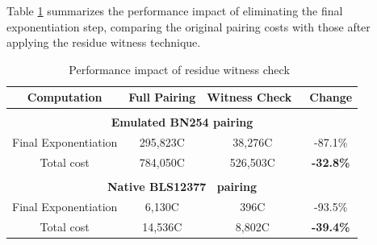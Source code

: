 Table \ref{tab:pairing_performance} summarizes the performance impact of eliminating the final exponentiation step, comparing the original pairing costs with those after applying the residue witness technique.

\begin{table}[h]
\centering
\caption{Performance impact of residue witness check~\cite{EPRINT:NovEag24}}
\label{tab:pairing_performance}
\begin{tabular}{|c|c|c|c|}
\hline
\textbf{Computation} & \textbf{Full Pairing} & \textbf{Witness Check~\cite{EPRINT:NovEag24}} & \textbf{Change} \\
\hline
\multicolumn{4}{|c|}{} \\
\multicolumn{4}{|c|}{\textbf{Emulated BN254 pairing}} \\
\hline
Final Exponentiation & 295,823C & 38,276C & -87.1\% \\
\hline
Total cost & 784,050C & 526,503C & \textbf{-32.8\%} \\
\hline
\multicolumn{4}{|c|}{} \\
\multicolumn{4}{|c|}{\textbf{Native BLS12377~\cite{sf2c22} pairing}} \\
\hline
Final Exponentiation & 6,130C & 396C & -93.5\% \\
\hline
Total cost & 14,536C & 8,802C & \textbf{-39.4\%} \\
\hline
\end{tabular}
\end{table}
